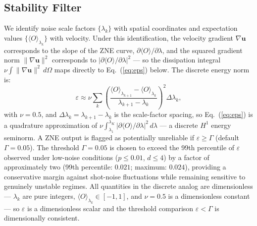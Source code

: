 \documentclass[10pt,letterpaper]{article}
\begin{document}
\subsection{Stability Filter}
We identify noise scale factors $\{\lambda_k\}$ with spatial coordinates
and expectation values $\{\langle O\rangle_{\lambda_k}\}$ with velocity.
Under this identification, the velocity gradient $\nabla\mathbf{u}$
corresponds to the slope of the ZNE curve,
$\partial\langle O\rangle/\partial\lambda$, and the squared gradient
norm $\|\nabla\mathbf{u}\|^{2}$ corresponds to
$|\partial\langle O\rangle/\partial\lambda|^{2}$ --- so the
dissipation integral $\nu\int\|\nabla\mathbf{u}\|^{2}\,d\Omega$
maps directly to Eq.~(\ref{eq:eps}) below.
The discrete energy norm is:
\begin{equation}
  \varepsilon \approx \nu\sum_{k}
    \!\left(\frac{\langle O\rangle_{\lambda_{k+1}}
      -\langle O\rangle_{\lambda_k}}
    {\lambda_{k+1}-\lambda_k}\right)^{\!2}\!\Delta\lambda_k,
  \label{eq:eps}
\end{equation}
with $\nu=0.5$, and $\Delta\lambda_k = \lambda_{k+1}-\lambda_k$ is the
scale-factor spacing, so Eq.~(\ref{eq:eps}) is a quadrature
approximation of $\nu\int_{\lambda_1}^{\lambda_K}
|\partial\langle O\rangle/\partial\lambda|^{2}\,d\lambda$ --- a
discrete $H^{1}$ energy seminorm.
A ZNE output is flagged as potentially unreliable
if $\varepsilon\geq\Gamma$ (default $\Gamma=0.05$).
The threshold $\Gamma=0.05$ is chosen to exceed the 99th percentile
of $\varepsilon$ observed under low-noise conditions ($p\leq 0.01$,
$d\leq 4$) by a factor of approximately two (99th percentile: $0.021$;
maximum: $0.024$), providing a conservative margin against shot-noise
fluctuations while remaining sensitive to genuinely unstable regimes.
All quantities in the discrete analog are dimensionless ---
$\lambda_k$ are pure integers, $\langle O\rangle_{\lambda_k}\in[-1,1]$,
and $\nu=0.5$ is a dimensionless constant --- so $\varepsilon$ is a
dimensionless scalar and the threshold comparison $\varepsilon<\Gamma$
is dimensionally consistent.
\end{document}
